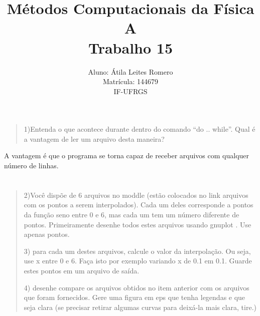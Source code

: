 \documentclass[brazilian,12pt,a4paper,final]{article}
\title{Métodos Computacionais da Física A \\ Trabalho 15}
\author{Aluno: Átila Leites Romero \\ Matrícula: 144679 \\ IF-UFRGS}
\begin{document}
\maketitle

\section{}
\begin{quote}
1)Entenda o que acontece durante dentro do comando ``do .. while''. Qual é a vantagem de ler um arquivo desta maneira?
\end{quote}
A vantagem é que o programa se torna capaz de receber arquivos com
qualquer número de linhas.

\section{}
\begin{quote}
2)Você dispõe de 6 arquivos no moddle (estão colocados no link arquivos com os pontos a serem interpolados). Cada um deles corresponde a pontos da função seno entre 0 e 6, mas cada um tem um número diferente de pontos.
Primeiramente desenhe todos estes arquivos usando gnuplot . Use apenas pontos.

3) para cada um destes arquivos, calcule o valor da interpolação. Ou seja, use x entre 0 e 6. Faça isto por exemplo variando x de 0.1 em 0.1. Guarde estes pontos em um arquivo de saída.

4) desenhe compare os arquivos obtidos no item anterior com os arquivos que foram fornecidos. Gere uma figura em eps que tenha legendas e que seja clara (se precisar retirar algumas curvas para deixá-la mais clara, tire.)
\end{quote}
\end{document}
